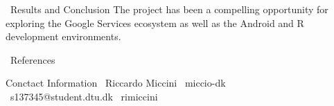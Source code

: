 \documentclass[final]{beamer}
\newlength{\onecolwid}
\begin{document}
\begin{frame}[t]
\begin{columns}[t]
\begin{column}{\onecolwid}
\begin{block}{\faPieChart \, Results and Conclusion}
		The project has been a compelling opportunity for exploring the Google Services ecosystem as well as the Android and R development environments.
	\end{block}

	\begin{block}{\faPaperclip \, References}
		\nocite{*}
		\printbibliography
	\end{block}

	\begin{alertblock}{ Conctact Information}
		\faUser \, Riccardo Miccini \hfill \faGithub \, miccio-dk \\
		\faEnvelope \, s137345@student.dtu.dk \hfill \faLinkedin \, rimiccini
	\end{alertblock}

\end{column}

\end{columns}
\end{frame}
\end{document}
